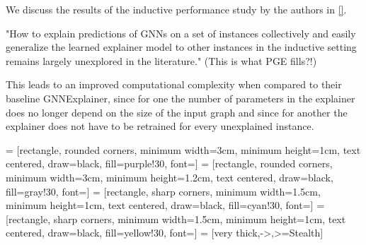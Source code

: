 We discuss the results of the inductive performance study by the authors in \ref{}.


"How to explain predictions of GNNs on a set of instances collectively and easily generalize the learned explainer model to other instances in the inductive setting remains largely unexplored in the literature." (This is what PGE fills?!)



This leads to an improved computational complexity when compared to their baseline GNNExplainer, since for one the number of parameters in the explainer does no longer depend on the size of the input graph and since for another the explainer does not have to be retrained for every unexplained instance.

 = [rectangle, rounded corners, minimum width=3cm, minimum height=1cm, text centered, draw=black, fill=purple!30, font=\small]
 = [rectangle, rounded corners, minimum width=3cm, minimum height=1.2cm, text centered, draw=black, fill=gray!30, font=\small]
 = [rectangle, sharp corners, minimum width=1.5cm, minimum height=1cm, text centered, draw=black, fill=cyan!30, font=\small]
 = [rectangle, sharp corners, minimum width=1.5cm, minimum height=1cm, text centered, draw=black, fill=yellow!30, font=\small]
 = [very thick,->,>=Stealth]    %

